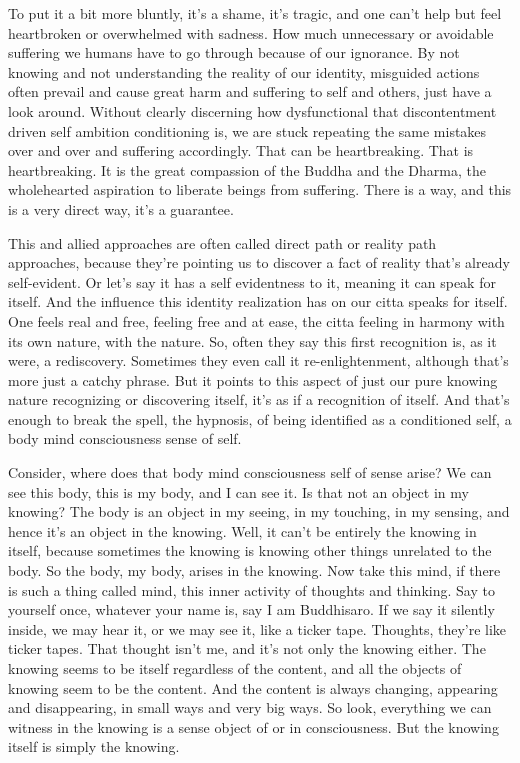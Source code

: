 \documentclass[12pt,openany]{book}
\begin{document}
To put it a bit more bluntly, it’s a shame, it's tragic, and one can't help but feel heartbroken or overwhelmed with sadness. How much unnecessary or avoidable suffering we humans have to go through because of our ignorance. By not knowing and not understanding the reality of our identity, misguided actions often prevail and cause great harm and suffering to self and others, just have a look around. Without clearly discerning how dysfunctional that discontentment driven self ambition conditioning is,  we are stuck repeating the same mistakes over and over and suffering accordingly. That can be heartbreaking. That is heartbreaking. It is the great compassion of the Buddha and the Dhar\-ma, the wholehearted aspiration to liberate beings from suffering. There is a way, and this is a very direct way, it's a guarantee.

This and allied approaches are often called direct path or reality path approaches, because they're pointing us to discover a fact of reality that's already self-evident. Or let's say it has a self evidentness to it, meaning it can speak for itself. And the influence this identity realization has on our citta speaks for itself. One feels real and free, feeling free and at ease, the citta feeling in harmony with its own nature, with the nature. So, often they say this first recognition is, as it were, a rediscovery. Sometimes they even call it re-enlightenment, although that's more just a catchy phrase. But it points to this aspect of just our pure knowing nature recognizing or discovering itself, it's as if a recognition of itself. And that's enough to break the spell, the hypnosis, of being identified as a conditioned self, a body mind consciousness sense of self.

Consider, where does that body mind consciousness self of sense arise? We can see this body, this is my body, and I can see it. Is that not an object in my knowing? The body is an object in my seeing, in my touching, in my sensing, and hence it's an object in the knowing. Well, it can't be entirely the knowing in itself, because sometimes the knowing is knowing other things unrelated to the body. So the body, my body, arises in the knowing. Now take this mind, if there is such a thing called mind, this inner activity of thoughts and thinking. Say to yourself once, whatever your name is, say I am Buddhisaro. If we say it silently inside, we may hear it, or we may see it, like a ticker tape. Thoughts, they’re like ticker tapes. That thought isn't me, and it's not only the knowing either. The knowing seems to be itself regardless of the content, and all the objects of knowing seem to be the content. And the content is always changing, appearing and disappearing, in small ways and very big ways. So look, everything we can witness in the knowing is a sense object of or in consciousness. But the knowing itself is simply the knowing.
\end{document}
